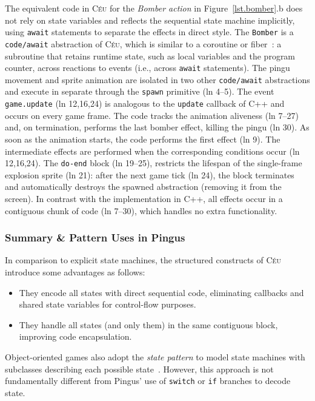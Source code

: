 \documentclass[10pt, conference, compsocconf]{IEEEtran}
\newcommand{\CEU}{\textsc{C\'{e}u}\xspace}
\newcommand{\code}[1] {{\small{\texttt{#1}}}}
\begin{document}
The equivalent code in \CEU for the \emph{Bomber action} in
Figure~\ref{lst.bomber}.b does not rely on state variables and reflects the
sequential state machine implicitly, using \code{await} statements to separate
the effects in direct style.
%
The \code{Bomber} is a \code{code/await} abstraction of \CEU, which is similar
to a coroutine or fiber~\cite{sync_async.cooperative}: a subroutine that
retains runtime state, such as local variables and the program counter, across
reactions to events (i.e., across \code{await} statements).
The pingu movement and sprite animation are isolated in two other
\code{code/await} abstractions and execute in separate through the \code{spawn}
primitive (ln 4--5).
The event \code{game.update} (ln 12,16,24) is analogous to the \code{update}
callback of C++ and occurs on every game frame.
%
The code tracks the animation aliveness (ln 7--27) and, on termination,
performs the last bomber effect, killing the pingu (ln 30).
As soon as the animation starts, the code performs the first effect (ln 9).
The intermediate effects are performed when the corresponding conditions occur
(ln 12,16,24).
The \code{do-end} block (ln 19--25), restricts the lifespan of the
single-frame explosion sprite (ln 21): after the next game tick (ln 24), the
block terminates and automatically destroys the spawned abstraction (removing
it from the screen).
%
In contrast with the implementation in C++, all effects occur in a contiguous
chunk of code (ln 7--30), which handles no extra functionality.

\subsubsection{Summary \& Pattern Uses in Pingus}

In comparison to explicit state machines, the structured constructs of \CEU
introduce some advantages as follows:
%
\begin{itemize}
\item They encode all states with direct sequential code, eliminating callbacks
      and shared state variables for control-flow purposes.
\item They handle all states (and only them) in the same contiguous block,
      improving code encapsulation.
\end{itemize}
%
Object-oriented games also adopt the \emph{state pattern} to model state
machines with subclasses describing each possible state~\cite{games.patterns}.
However, this approach is not fundamentally different from Pingus' use of
\code{switch} or \code{if} branches to decode state.
\end{document}
